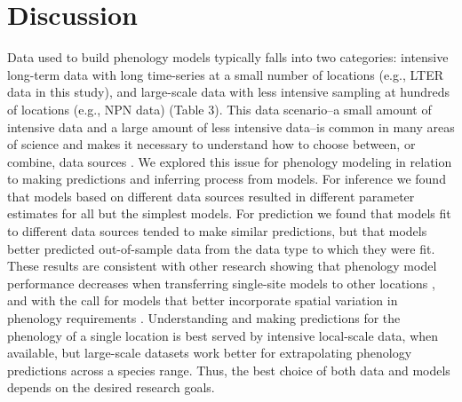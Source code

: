 \documentclass[fleqn,12pt,lineno]{article}
\begin{document}
\section*{Discussion}

Data used to build phenology models typically falls into two categories: intensive long-term data with long time-series at a small number of locations (e.g., LTER data in this study), and large-scale data with less intensive sampling at hundreds of locations (e.g., NPN data) (Table 3). This data scenario--a small amount of intensive data and a large amount of less intensive data--is common in many areas of science and makes it necessary to understand how to choose between, or combine, data sources \citep{hanks2018}. We explored this issue for phenology modeling in relation to making predictions and inferring process from models. For inference we found that models based on different data sources resulted in different parameter estimates for all but the simplest models. For prediction we found that models fit to different data sources tended to make similar predictions, but that models better predicted out-of-sample data from the data type to which they were fit. These results are consistent with other research showing that phenology model performance decreases when transferring single-site models to other locations \citep{garcia-mozo2008, xu2013, basler2016}, and with the call for models that better incorporate spatial variation in phenology requirements \citep{richardson2013, chuine2017}. Understanding and making predictions for the phenology of a single location is best served by intensive local-scale data, when available, but large-scale datasets work better for extrapolating phenology predictions across a species range. Thus, the best choice of both data and models depends on the desired research goals.
\end{document}
